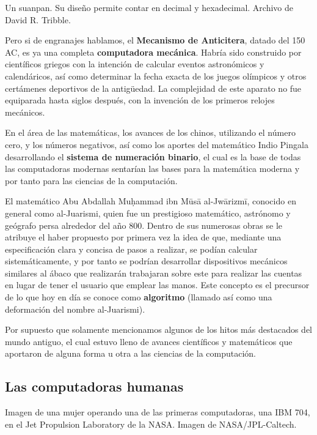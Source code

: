 {Un suanpan. Su diseño permite contar en decimal y hexadecimal.} {Archivo de
David R. Tribble.}

Pero si de engranajes hablamos, el \textbf{Mecanismo de Anticitera}, datado del
150 AC, es ya una completa \textbf{computadora mecánica}. Habría sido construido
por científicos griegos con la intención de calcular eventos astronómicos y
calendáricos, así como determinar la fecha exacta de los juegos olímpicos y
otros certámenes deportivos de la antigüedad. La complejidad de este aparato no
fue equiparada hasta siglos después, con la invención de los primeros relojes
mecánicos.\autocite{lin_2016}

 En el área de las matemáticas, los
avances de los chinos, utilizando el número cero, y los números negativos, así
como los aportes del matemático Indio Pingala desarrollando el \textbf{sistema
de numeración binario}, el cual es la base de todas las computadoras modernas
sentarían las bases para la matemática moderna y por tanto para las ciencias de
la computación.

El matemático Abu Abdallah Mu\d{h}ammad ibn M\={u}s\={a} al-Jw\={a}rizm\={i},
conocido en general como al-Juarismi, quien fue un prestigioso matemático,
astrónomo y geógrafo persa alrededor del año 800. Dentro de sus numerosas obras
se le atribuye el haber propuesto por primera vez la idea de que, mediante una
especificación clara y concisa de pasos a realizar, se podían calcular
sistemáticamente, y por tanto se podrían desarrollar dispositivos mecánicos
similares al ábaco que realizarán trabajaran sobre este para realizar las
cuentas en lugar de tener el usuario que emplear las manos. Este concepto es el
precursor de lo que hoy en día se conoce como \textbf{algoritmo} (llamado así
como una deformación del nombre al-Juarismi).

Por supuesto que solamente mencionamos algunos de los hitos más destacados del
mundo antiguo, el cual estuvo lleno de avances científicos y matemáticos que
aportaron de alguna forma u otra a las ciencias de la computación.

\subsection{Las computadoras humanas}

{Imagen de una mujer operando una de las primeras computadoras, una IBM 704, en
el Jet Propulsion Laboratory de la NASA.} {Imagen de NASA/JPL-Caltech.}

